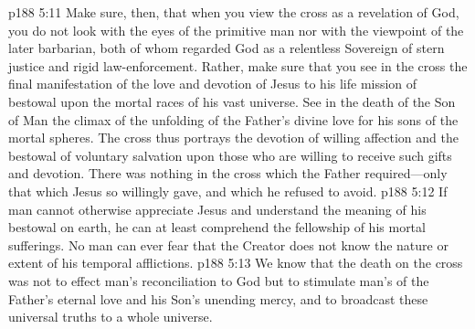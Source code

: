 \vs p188 5:11 Make sure, then, that when you view the cross as a revelation of God, you do not look with the eyes of the primitive man nor with the viewpoint of the later barbarian, both of whom regarded God as a relentless Sovereign of stern justice and rigid law\hyp{}enforcement. Rather, make sure that you see in the cross the final manifestation of the love and devotion of Jesus to his life mission of bestowal upon the mortal races of his vast universe. See in the death of the Son of Man the climax of the unfolding of the Father’s divine love for his sons of the mortal spheres. The cross thus portrays the devotion of willing affection and the bestowal of voluntary salvation upon those who are willing to receive such gifts and devotion. There was nothing in the cross which the Father required---only that which Jesus so willingly gave, and which he refused to avoid.
\pc \vs p188 5:12 If man cannot otherwise appreciate Jesus and understand the meaning of his bestowal on earth, he can at least comprehend the fellowship of his mortal sufferings. No man can ever fear that the Creator does not know the nature or extent of his temporal afflictions.
\vs p188 5:13 We know that the death on the cross was not to effect man’s reconciliation to God but to stimulate man’s  of the Father’s eternal love and his Son’s unending mercy, and to broadcast these universal truths to a whole universe.\plusone

